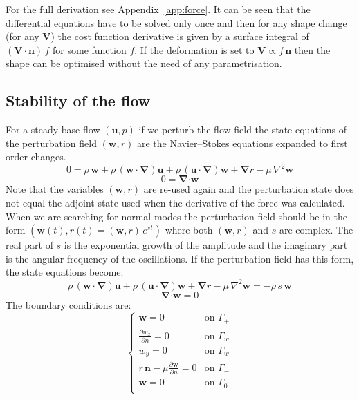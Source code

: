\documentclass[12pt, a4paper]{article}
\begin{document}
    For the full derivation see Appendix~\ref{app:force}. It can be seen that the differential equations have to be solved only once and then for any shape change (for any $\mathbf{V}$) the cost function derivative is given by a surface integral of $(\mathbf{V \cdot n}) \, f$ for some function $f$. If the deformation is set to $\mathbf{V} \propto f\, \mathbf{n}$ then the shape can be optimised without the need of any parametrisation. 
    
    \subsection{Stability of the flow}
    For a steady base flow $(\mathbf{u},p)$ if we perturb the flow field the state equations of the perturbation field $(\mathbf{w},r)$ are the Navier--Stokes equations expanded to first order changes.
    \begin{equation}
    0 = \rho \, \mathbf{\dot{w}} + 
    \rho \, (\mathbf{w \cdot} \boldsymbol{\nabla}) \mathbf{u} + 
    \rho \, (\mathbf{u \cdot} \boldsymbol{\nabla}) \mathbf{w} + 
    \boldsymbol{\nabla} r - 
    \mu \, \nabla^2 \mathbf{w}
    \end{equation}
    \begin{equation}
    0 = \boldsymbol{\nabla} \mathbf{\cdot w}
    \end{equation}
    Note that the variables $(\mathbf{w}, r)$ are re-used again and the perturbation state does not equal the adjoint state used when the derivative of the force was calculated. When we are searching for normal modes the perturbation field should be in the form $(\mathbf{w}(t),r(t) = (\mathbf{w},r) \, e^{st})$ where both $(\mathbf{w},r)$ and $s$ are complex. The real part of $s$ is the exponential growth of the amplitude and the imaginary part is the angular frequency of the oscillations. If the perturbation field has this form, the state equations become:
    \begin{equation} \label{perturbation_1}
    \rho \, (\mathbf{w \cdot} \boldsymbol{\nabla}) \mathbf{u} + 
    \rho \, (\mathbf{u \cdot} \boldsymbol{\nabla}) \mathbf{w} + 
    \boldsymbol{\nabla} r - 
    \mu \, \nabla^2 \mathbf{w} = 
    - \rho \, s \, \mathbf{w} 
    \end{equation}
    \begin{equation} \label{perturbation_2}
    \boldsymbol{\nabla} \mathbf{\cdot w} = 0
    \end{equation}
    The boundary conditions are:
    \begin{equation} \label{perturbation_bcs}
    \begin{cases}
    \mathbf{w} = 0 & \text{on } \Gamma_+ \\
    \frac{\partial w_x}{\partial n} = 0 & \text{on } \Gamma_w \\
    w_y = 0 & \text{on } \Gamma_w \\
    r \, \mathbf{n} - \mu \frac{\partial \mathbf{w}}{\partial n} = 0 & \text{on } \Gamma_- \\
    \mathbf{w} = 0 & \text{on } \Gamma_0 \\
    \end{cases}
    \end{equation}
\end{document}
